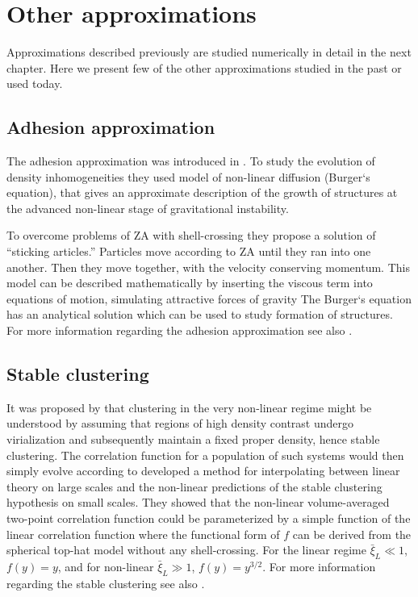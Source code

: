 \section{Other approximations}
Approximations described previously are studied numerically in detail in the next chapter. Here we present few of the other approximations studied in the past or used today.

\subsection{Adhesion approximation}
The adhesion approximation was introduced in \textcite{1989MNRAS.236..385G}. To study the evolution of density inhomogeneities they used model of non-linear diffusion (Burger`s equation), that gives an approximate description of the growth of structures at the advanced non-linear stage of gravitational instability.

To overcome problems of ZA with shell-crossing they propose a solution of ``sticking articles.'' Particles move according to ZA until they ran into one another. Then they move together, with the velocity conserving momentum. This model can be described mathematically by inserting the viscous term into equations of motion, simulating attractive forces of gravity
The Burger`s equation has an analytical solution which can be used to study formation of structures. For more information regarding the adhesion approximation see  also \textcite{1990MNRAS.247..260W,1994ApJ...428...28M}.

\subsection{Stable clustering}
It was proposed by \textcite{1974ApJ...189L..51P} that clustering in the very non-linear regime might be understood by assuming that regions of high density contrast undergo virialization and subsequently maintain a fixed proper density, hence stable clustering. The correlation function for a population of such systems would then simply evolve according to
\textcite{1991ApJ...374L...1H} developed a method for interpolating between linear theory on large scales and the non-linear predictions of the stable clustering hypothesis on small scales. They showed that the non-linear volume-averaged two-point correlation function could be parameterized by a simple function of the linear correlation function
where the functional form of $f$ can be derived from the spherical top-hat model without any shell-crossing. For the linear regime $\bar\xi_{L}\ll1$, $f(y)=y$, and for non-linear $\bar\xi_{L}\gg1$, $f(y)=y^{3/2}$. For more information regarding the stable clustering see  also \textcite{1996MNRAS.280L..19P,2003MNRAS.341.1311S}.
